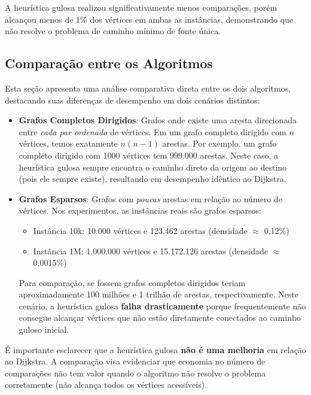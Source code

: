\documentclass[12pt,a4paper]{article}
\begin{document}
A heurística gulosa realizou significativamente menos comparações, porém alcançou menos de 1\% dos vértices em ambas as instâncias, demonstrando que não resolve o problema de caminho mínimo de fonte única.

\subsection{Comparação entre os Algoritmos}

Esta seção apresenta uma análise comparativa direta entre os dois algoritmos, destacando suas diferenças de desempenho em dois cenários distintos:

\begin{itemize}
    \item \textbf{Grafos Completos Dirigidos}: Grafos onde existe uma aresta direcionada entre \textit{cada par ordenado} de vértices. Em um grafo completo dirigido com $n$ vértices, temos exatamente $n(n-1)$ arestas. Por exemplo, um grafo completo dirigido com 1000 vértices tem 999.000 arestas. Neste caso, a heurística gulosa sempre encontra o caminho direto da origem ao destino (pois ele sempre existe), resultando em desempenho idêntico ao Dijkstra.
    
    \item \textbf{Grafos Esparsos}: Grafos com \textit{poucas} arestas em relação ao número de vértices. Nos experimentos, as instâncias reais são grafos esparsos:
    \begin{itemize}
        \item Instância 10k: 10.000 vértices e 123.462 arestas (densidade $\approx$ 0,12\%)
        \item Instância 1M: 1.000.000 vértices e 15.172.126 arestas (densidade $\approx$ 0,0015\%)
    \end{itemize}
    
    Para comparação, se fossem grafos completos dirigidos teriam aproximadamente 100 milhões e 1 trilhão de arestas, respectivamente. Neste cenário, a heurística gulosa \textbf{falha drasticamente} porque frequentemente não consegue alcançar vértices que não estão diretamente conectados ao caminho guloso inicial.
\end{itemize}

É importante esclarecer que a heurística gulosa \textbf{não é uma melhoria} em relação ao Dijkstra. A comparação visa evidenciar que economia no número de comparações não tem valor quando o algoritmo não resolve o problema corretamente (não alcança todos os vértices acessíveis).
\end{document}
